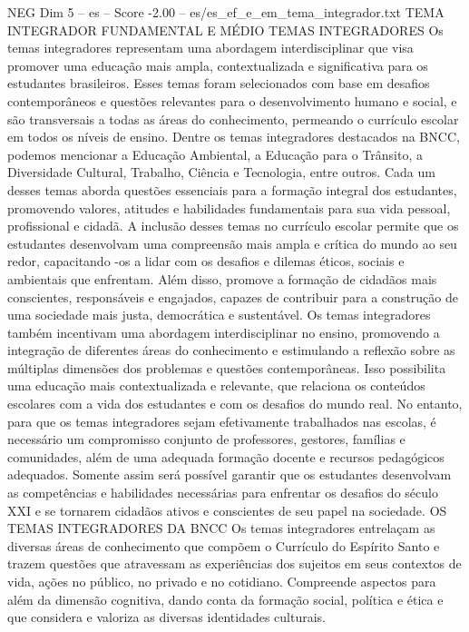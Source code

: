 \begin{textsample}{NEG Dim 5 – es – Score -2.00 – es/es\_ef\_e\_em\_tema\_integrador.txt}  \label{ex:f5_neg_183}
TEMA INTEGRADOR FUNDAMENTAL E MÉDIO TEMAS INTEGRADORES Os temas integradores representam uma abordagem interdisciplinar que visa promover uma educação mais ampla, contextualizada e significativa para os estudantes brasileiros.
Esses temas foram selecionados com base em desafios contemporâneos e questões relevantes para o desenvolvimento humano e social, e são transversais a todas as áreas do conhecimento, permeando o currículo escolar em todos os níveis de ensino.
Dentre os temas integradores destacados na BNCC, podemos mencionar a Educação Ambiental, a Educação para o Trânsito, a Diversidade Cultural, Trabalho, Ciência e Tecnologia, entre outros.
Cada um desses temas aborda questões essenciais para a formação integral dos estudantes, promovendo valores, atitudes e habilidades fundamentais para sua vida pessoal, profissional e cidadã.
A inclusão desses temas no currículo escolar permite que os estudantes desenvolvam uma compreensão mais ampla e crítica do mundo ao seu redor, capacitando -os a lidar com os desafios e dilemas éticos, sociais e ambientais que enfrentam.
Além disso, promove a formação de cidadãos mais conscientes, responsáveis e engajados, capazes de contribuir para a construção de uma sociedade mais justa, democrática e sustentável.
Os temas integradores também incentivam uma abordagem interdisciplinar no ensino, promovendo a integração de diferentes áreas do conhecimento e estimulando a reflexão sobre as múltiplas dimensões dos problemas e questões contemporâneas.
Isso possibilita uma educação mais contextualizada e relevante, que relaciona os conteúdos escolares com a vida dos estudantes e com os desafios do mundo real.
No entanto, para que os temas integradores sejam efetivamente trabalhados nas escolas, é necessário um compromisso conjunto de professores, gestores, famílias e comunidades, além de uma adequada formação docente e recursos pedagógicos adequados.
Somente assim será possível garantir que os estudantes desenvolvam as competências e habilidades necessárias para enfrentar os desafios do século XXI e se tornarem cidadãos ativos e conscientes de seu papel na sociedade.
OS TEMAS INTEGRADORES DA BNCC Os temas integradores entrelaçam as diversas áreas de conhecimento que compõem o Currículo do Espírito Santo e trazem questões que atravessam as experiências dos sujeitos em seus contextos de vida, ações no público, no privado e no cotidiano.
Compreende aspectos para além da dimensão cognitiva, dando conta da formação social, política e ética e que considera e valoriza as diversas identidades culturais.

\end{textsample}
